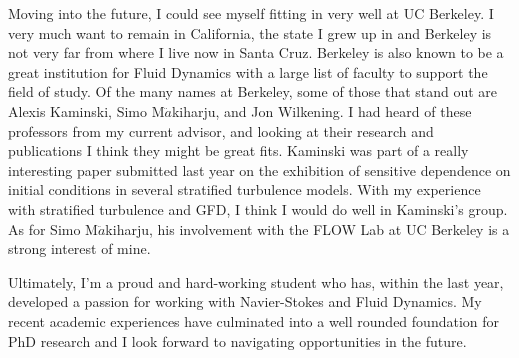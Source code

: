 \documentclass{article}
\begin{document}
Moving into the future, I could see myself fitting in very well at UC Berkeley. I very much want to remain in California, the state I grew up in and Berkeley is not very far from where I live now in Santa Cruz. Berkeley is also known to be a great institution for Fluid Dynamics with a large list of faculty to support the field of study. Of the many names at Berkeley, some of those that stand out are Alexis Kaminski, Simo M$\ddot{a}$kiharju, and Jon Wilkening. I had heard of these professors from my current advisor, and looking at their research and publications I think they might be great fits. Kaminski was part of a really interesting paper submitted last year on the exhibition of sensitive dependence on initial conditions in several stratified turbulence models. With my experience with stratified turbulence and GFD, I think I would do well in Kaminski's group. As for Simo M$\ddot{a}$kiharju, his involvement with the FLOW Lab at UC Berkeley is a strong interest of mine.  

Ultimately, I'm a proud and hard-working student who has, within the last year, developed a passion for working with Navier-Stokes and Fluid Dynamics. My recent academic experiences have culminated into a well rounded foundation for PhD research and I look forward to navigating opportunities in the future. 
\end{document}
